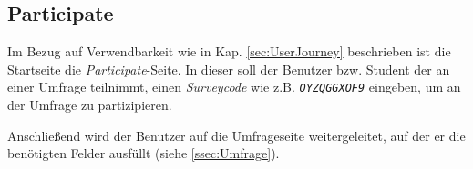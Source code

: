 \subsection{Participate}
Im Bezug auf Verwendbarkeit wie in Kap. \vref{sec:UserJourney} beschrieben ist die Startseite die \emph{Participate}-Seite. 
In dieser soll der Benutzer bzw. Student der an einer Umfrage teilnimmt, einen \emph{Surveycode} wie z.B. \emph{\texttt{OYZQGGXOF9}} eingeben, um an der Umfrage zu partizipieren. 

Anschließend wird der Benutzer auf die Umfrageseite weitergeleitet, auf der er die benötigten Felder ausfüllt (siehe \vref{ssec:Umfrage}).